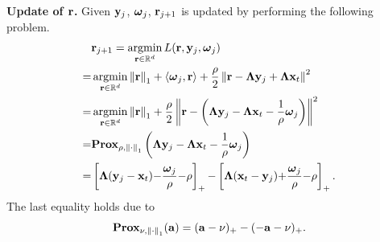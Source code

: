 \documentclass[journal]{IEEEtran}
\begin{document}
\textbf{Update of ${\bf r}$.} Given ${\bf y}_j$, $\boldsymbol{\omega}_j$, ${\bf r}_{j+1}$ is updated by performing the following problem.
\begin{align}
\nonumber
&\r_{j+1} = \argmin_{\r\in\RR^d} L(\r, \y_j, \bomega_j) \\ \nonumber
= & \argmin_{\r\in\RR^d} \lrnorm{\r}_1 + \lrangle{\bomega_j, \r} + \frac{\rho}{2}\lrnorm{\r - \bLambda \y_j + \bLambda\x_t}^2 \\ \nonumber
= & \argmin_{\r\in\RR^d} \lrnorm{\r}_1 + \frac{\rho}{2}\lrnorm{\r - \lrincir{\bLambda \y_j - \bLambda\x_t - \frac{1}{\rho}\bomega_j}}^2 \\ \nonumber
= & \Prox_{\rho, \lrnorm{\cdot}_1}\lrincir{\bLambda \y_j - \bLambda\x_t - \frac{1}{\rho}\bomega_j} \\ \nonumber
= & \left[\bLambda (\y_j - \x_t) \mathrm{-} \frac{\bomega_j}{\rho} \mathrm{-} \rho\right]_\mathrm{+}  \mathrm{-} \left[\bLambda (\x_t - \y_j) \mathrm{+} \frac{\bomega_j}{\rho} \mathrm{-} \rho\right]_\mathrm{+}.
\end{align} The last equality holds due to
\begin{align}
\nonumber
\textbf{Prox}_{\nu, \left\lVert\cdot\right\rVert_1}({\bf a}) = ({\bf a} - \nu)_+ - (-{\bf a} - \nu)_+.
\end{align}
\end{document}
